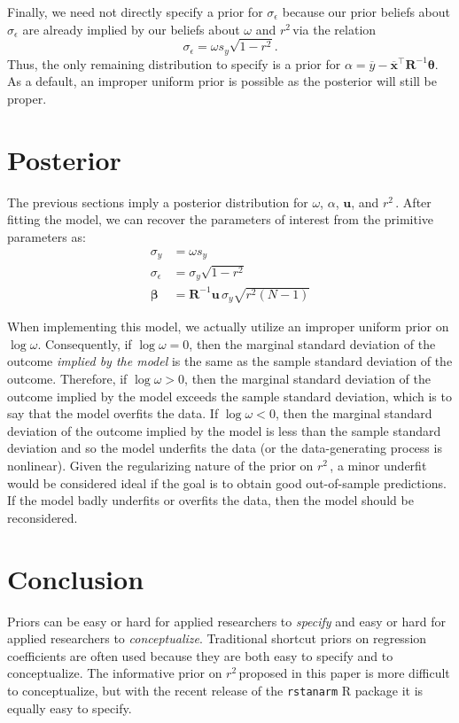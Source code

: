 \documentclass[11pt]{article}
\newcommand{\Rsq}{$r^2\,$}
\newcommand{\boldbeta}{\boldsymbol{\beta}}
\newcommand{\boldtheta}{\boldsymbol{\theta}}
\newcommand{\sigmaEps}{\sigma_{\epsilon}}
\newcommand{\R}{\mathbf{R}}
\renewcommand{\u}{\mathbf{u}}
\begin{document}
Finally, we need not directly specify a prior for $\sigmaEps$ because our prior
beliefs about $\sigmaEps$ are already implied by our beliefs about $\omega$ and
\Rsq via the relation
$$\sigmaEps = \omega s_y \sqrt{1 - r^2}.$$
Thus, the only remaining distribution to specify is a prior for
$\alpha = \overline{y} - \overline{\mathbf{x}}^\top \R^{-1} \boldtheta$.
As a default, an improper uniform prior is possible as the posterior will still
be proper.


\section{Posterior}

The previous sections imply a posterior distribution for $\omega$, $\alpha$,
$\u$, and \Rsq. After fitting the model, we can recover the parameters
of interest from the primitive parameters as:
%
\begin{align*}
\sigma_y &= \omega s_y \\
\sigmaEps &= \sigma_y \sqrt{1 - r^2} \\
\boldbeta &= \R^{-1} \u \, \sigma_y \sqrt{r^2 \left(N-1\right)}
\end{align*}

When implementing this model, we actually utilize an improper uniform prior on
$\log{\omega}$. Consequently, if $\log{\omega} = 0$, then the marginal standard
deviation of the outcome \emph{implied by the model} is the same as the sample
standard deviation of the outcome. Therefore, if $\log{\omega} > 0$, then the
marginal standard deviation of the outcome implied by the model exceeds the
sample standard deviation, which is to say that the model overfits the data. If
$\log{\omega} < 0$, then the marginal standard deviation of the outcome implied
by the model is less than the sample standard deviation and so the model
underfits the data (or the data-generating process is nonlinear). Given the
regularizing nature of the prior on \Rsq, a minor underfit would be considered
ideal if the goal is to obtain good out-of-sample predictions. If the model
badly underfits or overfits the data, then the model should be reconsidered.


\section{Conclusion}

Priors can be easy or hard for applied researchers to \emph{specify} and easy or
hard for applied researchers to \emph{conceptualize}. Traditional shortcut
priors on regression coefficients are often used because they are both easy to
specify and to conceptualize. The informative prior on \Rsq proposed in this
paper is more difficult to conceptualize, but with the recent release of the
{\tt rstanarm} R package it is equally easy to specify.
\end{document}
